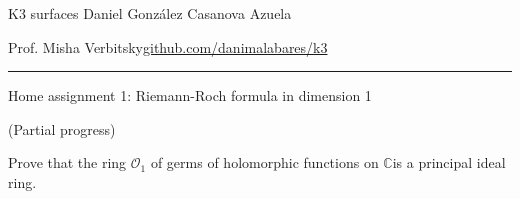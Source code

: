 

\usepackage[style=authortitle-terse,backend=bibtex]{biblatex}




\begin{minipage}{\textwidth}
	\begin{minipage}{1\textwidth}
		K3 surfaces \hfill Daniel González Casanova Azuela
		
		{\small Prof. Misha Verbitsky\hfill\href{https://github.com/danimalabares/k3}{github.com/danimalabares/k3}}
	\end{minipage}
\end{minipage}\vspace{.2cm}\hrule

\vspace{10pt}
{\huge Home assignment 1: Riemann-Roch formula in dimension 1}

(Partial progress)

\begin{manualexercise}{1}
	Prove that the ring $\mathcal{O}_1$ of germs of holomorphic functions on $\mathbb{C}$is a principal ideal ring.
\end{manualexercise}


